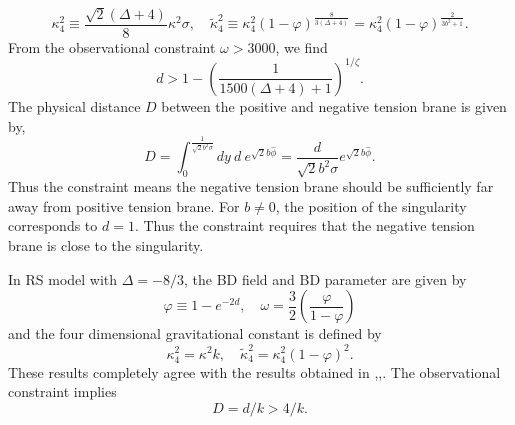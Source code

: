 \documentclass[a4paper,11pt]{article}
\begin{document}
\begin{equation}
\kappa_4^2 \equiv \frac{\sqrt{2}(\Delta +4)}{8}\kappa^2 \sigma,\quad 
\tilde{\kappa}_4^2 
\equiv \kappa_4^2(1-\varphi)^{\frac{8}{3(\Delta+4)}}=
\kappa_4^2 (1-\varphi)^{\frac{2}{3 b^2+1}}.
\end{equation}
From the observational constraint $\omega > 3000$, we find 
\begin{equation}
d > 1 - \left(\frac{1}{1500(\Delta +4)+1} \right)^{1/\zeta}. 
\end{equation}
The physical distance $D$ between the positive and negative tension brane 
is given by, 
\begin{equation}
D = \int_0^{\frac{1}{\sqrt{2}b^2 \sigma}} dy \ d \ e^{\sqrt{2}b\hat{\phi}} 
= \frac{d}{\sqrt{2}b^2 \sigma} e^{\sqrt{2}b\hat{\phi}} .
\end{equation}
Thus the constraint means the negative tension brane should be
sufficiently far away from positive tension brane. For $b \neq 0$,
the position of the singularity corresponds to $d=1$. Thus the 
constraint requires that the negative tension brane is close to 
the singularity.

In RS model with $\Delta=-8/3$, the BD field and BD parameter are 
given by
\begin{equation}
\varphi \equiv 1-e^{-2d},\quad \omega=\frac{3}{2} 
\left( \frac{\varphi}{1-\varphi} \right)
\end{equation}
and the four dimensional gravitational constant is defined by 
\begin{equation}
\kappa_4^2= \kappa^2 k,\quad \tilde{\kappa}_4^2=\kappa_4^2 (1-\varphi)^2.
\end{equation}
These results completely agree with the results obtained in 
\cite{Kanno1},\cite{Kanno2},\cite{GT}. The observational constraint implies
\begin{equation}
D= d /k > 4 /k. 
\end{equation}
\end{document}
